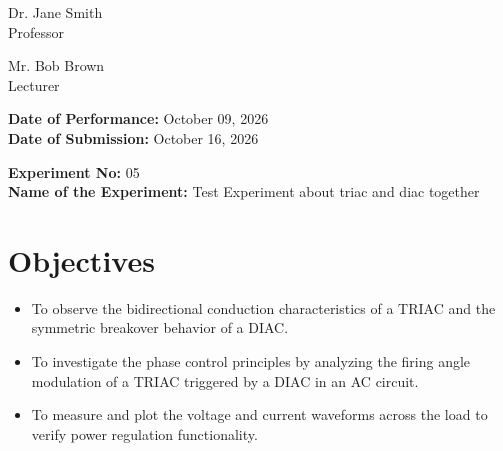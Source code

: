 \documentclass[12pt,a4paper]{article}
\begin{document}
\begin{titlepage}
\begin{minipage}[t]{0.5\textwidth}
\begin{flushright}
            Dr. Jane Smith \\
            Professor \\
            \vspace{0.3cm}
            
            Mr. Bob Brown \\
            Lecturer \\
            
            
        \end{flushright}
    \end{minipage}

    \vfill
    \textbf{Date of Performance:} October 09, 2026 \\
    \textbf{Date of Submission:} October 16, 2026
    
\end{titlepage}

\setcounter{page}{1}
\rmfamily %
\normalsize

\begin{center}
    \textbf{Experiment No:} 05 \\
    \vspace{0.2cm}
    \textbf{Name of the Experiment:} Test Experiment about triac and diac together
\end{center}
\vspace{0.5cm}


\section{Objectives}
\begin{itemize}

    \item To observe the bidirectional conduction characteristics of a TRIAC and the symmetric breakover behavior of a DIAC.

    \item To investigate the phase control principles by analyzing the firing angle modulation of a TRIAC triggered by a DIAC in an AC circuit.

    \item To measure and plot the voltage and current waveforms across the load to verify power regulation functionality.

\end{itemize}
\end{document}
